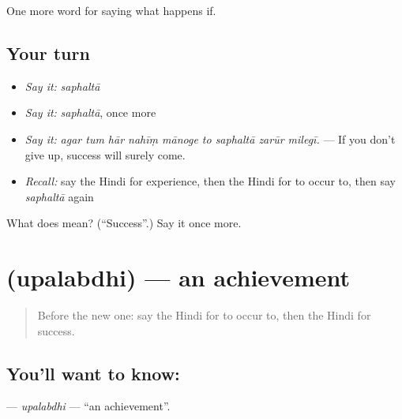 \begin{grammarlens}[title={What you've built}]
One more word for saying what happens if.
\end{grammarlens}

\subsection*{Your turn}
\begin{itemize}
\raggedright
  \item \emph{Say it:} \emph{saphaltā}
  \item \emph{Say it:} \emph{saphaltā}, once more
  \item \emph{Say it:} \emph{agar tum hār nahīṃ mānoge to saphaltā zarūr milegī.} — If you don't give up, success will surely come.
  \item \emph{Recall:} say the Hindi for experience, then the Hindi for to occur to, then say \emph{saphaltā} again
\end{itemize}

\begin{tcolorbox}[breakable,colback=teal!4,colframe=teal!35!black,title={Before you move on}]
What does  mean? (\textquotedblleft{}Success\textquotedblright{}.) Say it once more.
\end{tcolorbox}
\section[\texorpdfstring{\hi{उपलब्धि} (upalabdhi)}{उपलब्धि (upalabdhi)}]{ (upalabdhi) — an achievement}

\label{lesson:HI-C393-upalabdhi}



\begin{quote}
Before the new one: say the Hindi for to occur to, then the Hindi for success.
\end{quote}

\subsection*{You'll want to know: }
\textbf{} — \emph{upalabdhi} — \textquotedblleft{}an achievement\textquotedblright{}.

\begin{quote}
           
\end{quote}

